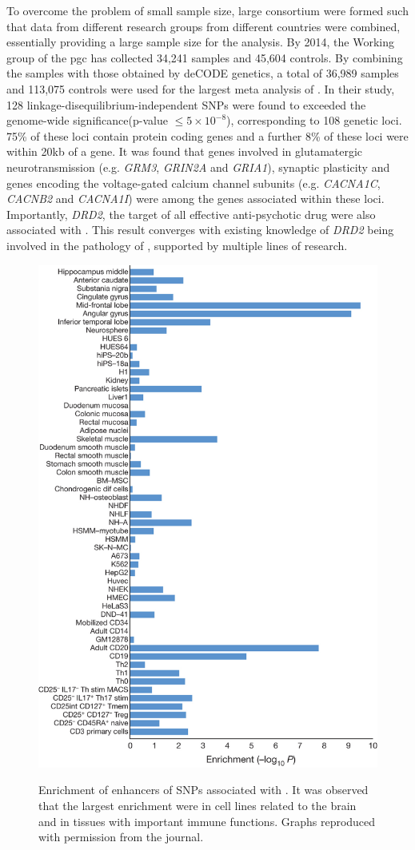 	To overcome the problem of small sample size, large consortium were formed such that data from different research groups from different countries were combined, essentially providing a large sample size for the analysis.
	By 2014, the  Working group of the \gls{pgc} has collected 34,241  samples and 45,604 controls\citep{Ripke2014}.
	By combining the samples with those obtained by deCODE genetics, a total of 36,989  samples and 113,075 controls were used for the largest meta analysis of .
	In their study\citep{Ripke2014}, 128 linkage-disequilibrium-independent \glspl{SNP} were found to  exceeded the genome-wide significance(p-value $\le 5\times10^{-8}$), corresponding to 108 genetic loci.
	75\% of these loci contain protein coding genes and a further 8\% of these loci were within 20kb of a gene. 
	It was found that genes involved in glutamatergic neurotransmission (e.g. \textit{GRM3}, \textit{GRIN2A} and \textit{GRIA1}), synaptic plasticity and genes encoding the voltage-gated calcium channel subunits (e.g. \textit{CACNA1C}, \textit{CACNB2} and \textit{CACNA1I}) were among the genes associated within these loci.
	Importantly, \textit{DRD2}, the target of all effective anti-psychotic drug were also associated with .
	This result converges with existing knowledge of \textit{DRD2} being involved in the pathology of , supported by multiple lines of research\citep{Talkowski2007}.
	\begin{figure}
		\centering
		\caption[Enrichment of enhancers of SNPs associated with Schizophrenia]{Enrichment of enhancers of SNPs associated with . 
			It was observed that the largest enrichment were in cell lines related to the brain and in tissues with important immune functions. 
			Graphs reproduced with permission from the journal.\citep{Ripke2014}}
		\includegraphics[height=\textwidth]{figure/pgc_enrichment_tissue.jpg}
		\label{fig:pgcEnrich}
	\end{figure}
